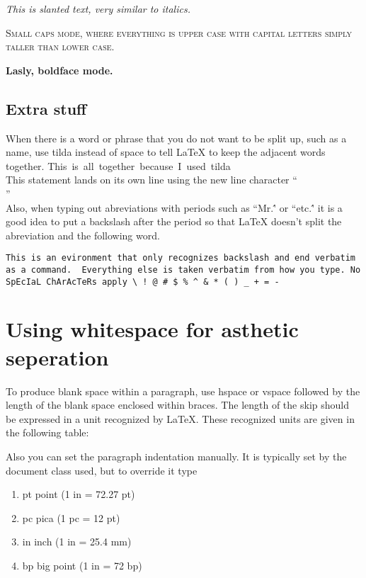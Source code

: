 \documentclass[a4paper, 10pt]{article}
\begin{document}
\textsl{ This is slanted text, very similar to italics.}

\textsc{ Small caps mode, where everything is upper case with capital
  letters simply taller than lower case.}

\textbf{ Lasly, boldface mode.}


\subsection*{Extra stuff}
When there is a word or phrase that you do not want to be split up,
such as a name, use tilda instead of space to tell LaTeX to keep the
adjacent words together.  This~is~all~together~because~I~used~tilda
\\This statement lands on its own line using the new line character ``\\''\\
Also, when typing out abreviations with periods such as ``Mr.\'' or
``etc.\'' it is a good idea to put a backslash after the period so that
LaTeX doesn't split the abreviation and the following word.

\begin{verbatim}
This is an evironment that only recognizes backslash and end verbatim
as a command.  Everything else is taken verbatim from how you type. No
SpEcIaL ChArAcTeRs apply \ ! @ # $ % ^ & * ( ) _ + = - 
\end{verbatim}


\section*{Using whitespace for asthetic seperation}
 To produce blank space within a paragraph, use hspace or vspace
 followed by the length of the blank space enclosed within braces. The
 length of the skip should be expressed in a unit recognized by
 LaTeX. These recognized units are given in the following table:

 Also you can set the paragraph indentation manually.  It is typically
 set by the document class used, but to override it type


\vspace{5 mm}

\begin{enumerate}
\item
    pt  point         (1 in = 72.27 pt)
\item
    pc  pica          (1 pc = 12 pt)
\item
    in  inch          (1 in = 25.4 mm)
\item
    bp  big point     (1 in = 72 bp)
\end{enumerate}
\end{document}
